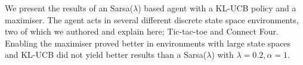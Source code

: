 We present the results of an Sarsa($\lambda$) based agent with a KL-UCB policy
and a maximiser. The agent acts in several different discrete state space
environments, two of which we authored and explain here; Tic-tac-toe and Connect
Four. Enabling the maximiser proved better in environments with large state
spaces and KL-UCB did not yield better results than a Sarsa($\lambda$) with
$\lambda = 0.2, \alpha = 1$.
